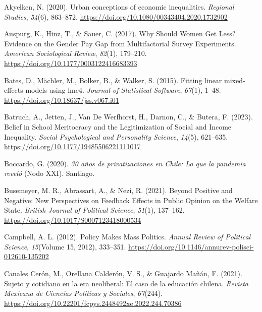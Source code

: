 \documentclass[
  12pt,
]{article}
\newlength{\cslhangindent}
\newlength{\cslentryspacingunit} %
\newenvironment{CSLReferences}[2] %
 {%
  \setlength{\parindent}{0pt}
  \ifodd #1
  \let\oldpar\par
  \def\par{\hangindent=\cslhangindent\oldpar}
  \fi
  \setlength{\parskip}{#2\cslentryspacingunit}
 }%
 {}
\begin{document}
\hypertarget{refs}{}
\begin{CSLReferences}{1}{0}
\leavevmode{}%
Akyelken, N. (2020). Urban conceptions of economic inequalities.
\emph{Regional Studies}, \emph{54}(6), 863--872.
\url{https://doi.org/10.1080/00343404.2020.1732902}

\leavevmode{}%
Auspurg, K., Hinz, T., \& Sauer, C. (2017). Why {Should Women Get Less}?
{Evidence} on the {Gender Pay Gap} from {Multifactorial Survey
Experiments}. \emph{American Sociological Review}, \emph{82}(1),
179--210. \url{https://doi.org/10.1177/0003122416683393}

\leavevmode{}%
Bates, D., Mächler, M., Bolker, B., \& Walker, S. (2015). Fitting linear
mixed-effects models using {lme4}. \emph{Journal of Statistical
Software}, \emph{67}(1), 1--48.
\url{https://doi.org/10.18637/jss.v067.i01}

\leavevmode{}%
Batruch, A., Jetten, J., Van De Werfhorst, H., Darnon, C., \& Butera, F.
(2023). Belief in {School Meritocracy} and the {Legitimization} of
{Social} and {Income Inequality}. \emph{Social Psychological and
Personality Science}, \emph{14}(5), 621--635.
\url{https://doi.org/10.1177/19485506221111017}

\leavevmode{}%
Boccardo, G. (2020). \emph{30 a{ñ}os de privatizaciones en {Chile}: Lo
que la pandemia revel{ó}} (Nodo XXI). Santiago.

\leavevmode{}%
Busemeyer, M. R., Abrassart, A., \& Nezi, R. (2021). Beyond {Positive}
and {Negative}: {New Perspectives} on {Feedback Effects} in {Public
Opinion} on the {Welfare State}. \emph{British Journal of Political
Science}, \emph{51}(1), 137--162.
\url{https://doi.org/10.1017/S0007123418000534}

\leavevmode{}%
Campbell, A. L. (2012). Policy {Makes Mass Politics}. \emph{Annual
Review of Political Science}, \emph{15}(Volume 15, 2012), 333--351.
\url{https://doi.org/10.1146/annurev-polisci-012610-135202}

\leavevmode{}%
Canales Cerón, M., Orellana Calderón, V. S., \& Guajardo Mañán, F.
(2021). Sujeto y cotidiano en la era neoliberal: El caso de la
educaci{ó}n chilena. \emph{Revista Mexicana de Ciencias Pol{í}ticas y
Sociales}, \emph{67}(244).
\url{https://doi.org/10.22201/fcpys.2448492xe.2022.244.70386}


\end{CSLReferences}
\end{document}
